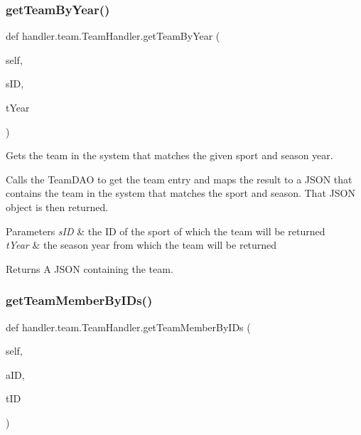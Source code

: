 \subsubsection{\texorpdfstring{get\+Team\+By\+Year()}{getTeamByYear()}}
{\footnotesize\ttfamily def handler.\+team.\+Team\+Handler.\+get\+Team\+By\+Year (\begin{DoxyParamCaption}\item[{}]{self,  }\item[{}]{s\+ID,  }\item[{}]{t\+Year }\end{DoxyParamCaption})}



Gets the team in the system that matches the given sport and season year. 

Calls the Team\+D\+AO to get the team entry and maps the result to a J\+S\+ON that contains the team in the system that matches the sport and season. That J\+S\+ON object is then returned.


\begin{DoxyParams}{Parameters}
{\em s\+ID} & the ID of the sport of which the team will be returned \\
\hline
{\em t\+Year} & the season year from which the team will be returned\\
\hline
\end{DoxyParams}
\begin{DoxyReturn}{Returns}
A J\+S\+ON containing the team. 
\end{DoxyReturn}
\mbox{\label{classhandler_1_1team_1_1_team_handler_a1a00f6d69828c15ce2da7b4215c868cf}} 
\subsubsection{\texorpdfstring{get\+Team\+Member\+By\+I\+Ds()}{getTeamMemberByIDs()}}
{\footnotesize\ttfamily def handler.\+team.\+Team\+Handler.\+get\+Team\+Member\+By\+I\+Ds (\begin{DoxyParamCaption}\item[{}]{self,  }\item[{}]{a\+ID,  }\item[{}]{t\+ID }\end{DoxyParamCaption})}



